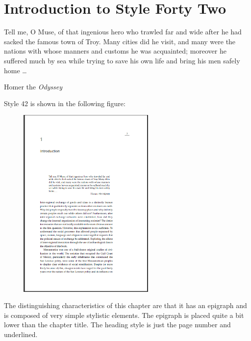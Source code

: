 




\chapter{Introduction to Style Forty Two}

\epigraph{Tell me, O Muse, of that ingenious hero who trawled far and wide after he had
sacked the famous town of Troy. Many cities did he visit, and many were the nations with whose manners
and customs he was acquainted; moreover he suffered much by sea while trying to save his own life and bring
his men safely home \ldots }{Homer the \textit{Odyssey}}

Style 42 is shown in the following figure:

\begin{figure}[ht]
\centering
\includegraphics[width=0.6\textwidth]{./chapters/chapter42}
\end{figure}
The distinguishing characteristics of this chapter are that it has an epigraph and is composed of very simple stylistic elements. The epigraph is placed quite a bit lower than the chapter title. The heading style is just the page number and underlined.



